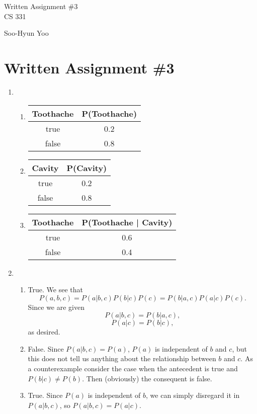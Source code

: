 \documentclass[10pt,letterpaper]{article}
\begin{document}
\begin{titlepage}
	\vspace*{4cm}
	\begin{flushright}
	{\huge
		Written Assignment \#3 \\ [3cm]
	}
	{\large
		CS 331
	}
	\end{flushright}

	\begin{flushright}
	Soo-Hyun Yoo
	\end{flushright}
\end{titlepage}

\section*{Written Assignment \#3}

\begin{enumerate}
	\item
		\begin{enumerate}
			\item
				\begin{tabular}{|c|c|} \hline
					{\bf Toothache} & {\bf P(Toothache)} \\ \hline
					true & 0.2 \\ \hline
					false & 0.8 \\ \hline
				\end{tabular}
			\item
				\begin{tabular}{|c|c|} \hline
					{\bf Cavity} & {\bf P(Cavity)} \\ \hline
					true & 0.2 \\ \hline
					false & 0.8 \\ \hline
				\end{tabular}
			\item
				\begin{tabular}{|c|c|} \hline
					{\bf Toothache} & {\bf P(Toothache | Cavity)} \\ \hline
					true & 0.6 \\ \hline
					false & 0.4 \\ \hline
				\end{tabular}
		\end{enumerate}

	\item
		\begin{enumerate}
			\item True. We see that \[P(a,b,c) = P(a|b,c)P(b|c)P(c)
				= P(b|a,c)P(a|c)P(c).\] Since we are given \[P(a|b,c)
				= P(b|a,c),\] \[P(a|c) = P(b|c),\] as desired.
			\item False. Since $P(a|b,c)=P(a)$, $P(a)$ is independent of $b$
				and $c$, but this does not tell us anything about the
				relationship between $b$ and $c$. As a counterexample consider
				the case when the antecedent is true and $P(b|c) \neq P(b)$.
				Then (obviously) the consequent is false.
			\item True. Since $P(a)$ is independent of $b$, we can simply
				disregard it in $P(a|b,c)$, so $P(a|b,c)=P(a|c)$.
		\end{enumerate}


\end{enumerate}
\end{document}
